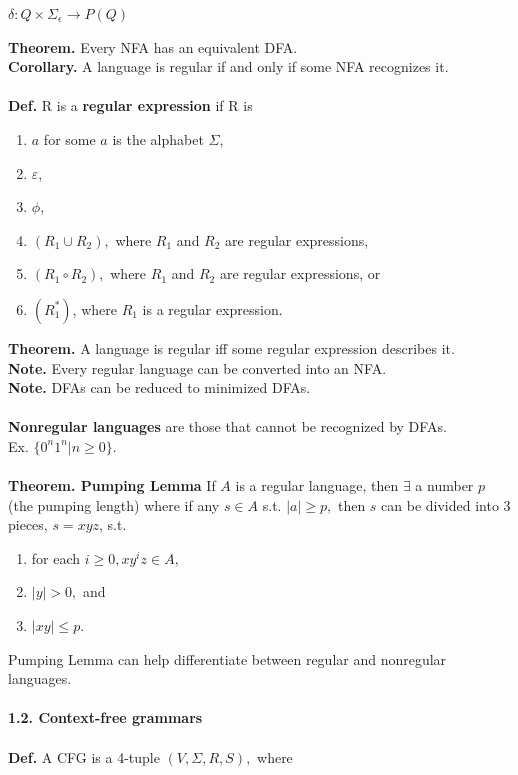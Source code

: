 \documentclass[12pt]{article}
\begin{document}
\begin{multicols}{2}
\begin{center}
$\delta: Q \times \Sigma_{\epsilon} \rightarrow P(Q)$
\end{center}
\textbf{Theorem.} Every NFA has an equivalent DFA.\\
\textbf{Corollary.} A language is regular if and only if some NFA recognizes it.\\
\\
\textbf{Def.} R is a \textbf{regular expression} if R is
\begin{enumerate}
\itemsep-0.5em
\item $a$ for some $a$ is the alphabet $\Sigma$,
\item $\varepsilon$,
\item $\phi$,
\item $(R_{1} \cup R_{2}),$ where $R_{1}$ and $R_{2}$ are regular expressions,
\item $(R_{1} \circ R_{2}),$ where $R_{1}$ and $R_{2}$ are regular expressions, or
\item $(R_{1}^{*})$, where $R_{1}$ is a regular expression.
\end{enumerate}
\textbf{Theorem.} A language is regular iff some regular expression describes it.\\
\textbf{Note.} Every regular language can be converted into an NFA.\\
\textbf{Note.} DFAs can be reduced to minimized DFAs.\\
\\
\textbf{Nonregular languages} are those that cannot be recognized by DFAs.\\
Ex. $\lbrace 0^{n}1^{n} | n \geq 0 \rbrace.$\\\\
\textbf{Theorem. Pumping Lemma} If $A$ is a regular language, then $\exists$ a number $p$ (the pumping length) where if any $s \in A$ s.t. $|a| \geq p,$ then $s$ can be divided into 3 pieces, $s=xyz$, s.t.
\begin{enumerate}
\itemsep-0.5em
\item for each $i \geq 0, xy^{i}z \in A,$
\item $|y| > 0,$ and
\item $|xy| \leq p.$
\end{enumerate}
Pumping Lemma can help differentiate between regular and nonregular languages.\\\\
\textbf{1.2. Context-free grammars}\\\\
\textbf{Def.} A CFG is a 4-tuple $(V, \Sigma, R, S),$ where
\begin{enumerate}

\end{enumerate}
\end{multicols}
\end{document}

